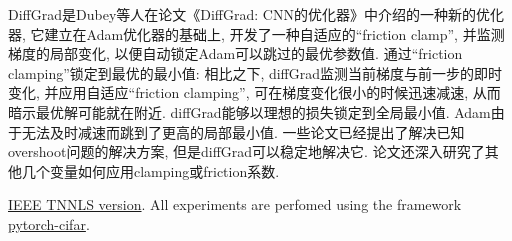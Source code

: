 DiffGrad是Dubey等人在论文《DiffGrad: CNN的优化器》中介绍的一种新的优化器, 它建立在Adam优化器的基础上, 开发了一种自适应的“friction clamp”, 并监测梯度的局部变化, 以便自动锁定Adam可以跳过的最优参数值.
通过“friction clamping”锁定到最优的最小值: 相比之下, diffGrad监测当前梯度与前一步的即时变化, 并应用自适应“friction clamping”, 可在梯度变化很小的时候迅速减速, 从而暗示最优解可能就在附近.
diffGrad能够以理想的损失锁定到全局最小值. Adam由于无法及时减速而跳到了更高的局部最小值.
一些论文已经提出了解决已知overshoot问题的解决方案, 但是diffGrad可以稳定地解决它.
论文还深入研究了其他几个变量如何应用clamping或friction系数.

\href{https://ieeexplore.ieee.org/document/8939562}{IEEE TNNLS version}.
All experiments are perfomed using the framework \href{https://github.com/kuangliu/pytorch-cifar}{pytorch-cifar}.
